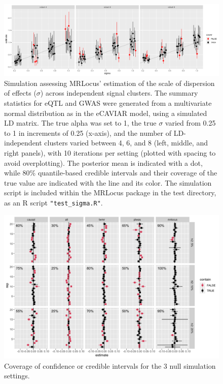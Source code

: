 \documentclass[11pt]{article}
\begin{document}
\begin{figure}[!ht]
  \centering
  \includegraphics[width=\textwidth]{figs/sigma_est.png}
  \caption{Simulation assessing MRLocus' estimation of the scale of
    dispersion of effects ($\sigma$) across independent signal
    clusters. The summary statistics for eQTL and GWAS were generated from
    a multivariate normal distribution as in the eCAVIAR model, using
    a simulated LD matrix. The true alpha was set to 1, the true $\sigma$
    varied from 0.25 to 1 in increments of 0.25 (x-axis), and the
    number of LD-independent clusters varied between 4, 6, and 8
    (left, middle, and right panels), with 10 iterations per setting
    (plotted with spacing to avoid overplotting). The posterior mean
    is indicated with a dot, while 80\% quantile-based credible
    intervals and their coverage of the true value are indicated with
    the line and its color. The simulation script is included within
    the MRLocus package in the test directory, as an R script
    \texttt{"test\_sigma.R"}.} 
\end{figure}

\begin{figure}[!ht]
  \centering
  \includegraphics[width=\textwidth]{figs/nullplot.png}
  \caption{Coverage of confidence or credible intervals for the 3 null
    simulation settings.}
\end{figure}
\end{document}
